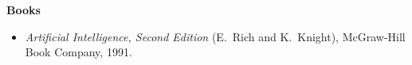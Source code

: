 







\vspace{0.2in}

\noindent
{\bf Books}

\begin{itemize}
\item {\em Artificial Intelligence, Second Edition} (E.~Rich and K.~Knight),
McGraw-Hill Book Company, 1991.
\end{itemize}


